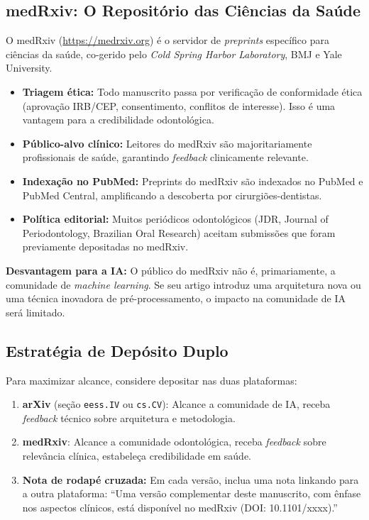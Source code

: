 \subsection{medRxiv: O Repositório das Ciências da Saúde}

O medRxiv (\url{https://medrxiv.org}) é o servidor de \textit{preprints}
específico para ciências da saúde, co-gerido pelo \textit{Cold Spring Harbor
Laboratory}, BMJ e Yale University.

\begin{itemize}
  \item \textbf{Triagem ética:} Todo manuscrito passa por verificação de
    conformidade ética (aprovação IRB/CEP, consentimento, conflitos de
    interesse). Isso é uma vantagem para a credibilidade odontológica.
  \item \textbf{Público-alvo clínico:} Leitores do medRxiv são majoritariamente
    profissionais de saúde, garantindo \textit{feedback} clinicamente relevante.
  \item \textbf{Indexação no PubMed:} Preprints do medRxiv são indexados no
    PubMed e PubMed Central, amplificando a descoberta por cirurgiões-dentistas.
  \item \textbf{Política editorial:} Muitos periódicos odontológicos (JDR,
    Journal of Periodontology, Brazilian Oral Research) aceitam submissões que
    foram previamente depositadas no medRxiv.
\end{itemize}

\textbf{Desvantagem para a IA:} O público do medRxiv não é, primariamente, a
comunidade de \textit{machine learning}. Se seu artigo introduz uma arquitetura
nova ou uma técnica inovadora de pré-processamento, o impacto na comunidade de
IA será limitado.

\subsection{Estratégia de Depósito Duplo}

Para maximizar alcance, considere depositar nas duas plataformas:

\begin{enumerate}
  \item \textbf{arXiv} (seção \texttt{eess.IV} ou \texttt{cs.CV}): Alcance a
    comunidade de IA, receba \textit{feedback} técnico sobre arquitetura e
    metodologia.
  \item \textbf{medRxiv}: Alcance a comunidade odontológica, receba
    \textit{feedback} sobre relevância clínica, estabeleça credibilidade em
    saúde.
  \item \textbf{Nota de rodapé cruzada:} Em cada versão, inclua uma nota
    linkando para a outra plataforma: ``Uma versão complementar deste manuscrito,
    com ênfase nos aspectos clínicos, está disponível no medRxiv (DOI:
    10.1101/xxxx).''
\end{enumerate}

